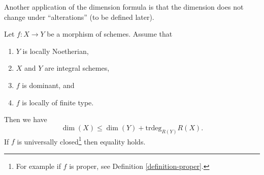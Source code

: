 \noindent
Another application of the dimension formula
is that the dimension does not change under
``alterations'' (to be defined later).

\begin{lemma}
\label{lemma-alteration-dimension}
Let $f : X \to Y$ be a morphism of schemes. Assume that
\begin{enumerate}
\item $Y$ is locally Noetherian,
\item $X$ and $Y$ are integral schemes,
\item $f$ is dominant, and
\item $f$ is locally of finite type.
\end{enumerate}
Then we have
$$
\dim(X) \leq \dim(Y) + \text{trdeg}_{R(Y)} R(X).
$$
If $f$ is universally closed\footnote{For example if $f$ is proper, see
Definition \ref{definition-proper}.} then equality holds.
\end{lemma}

